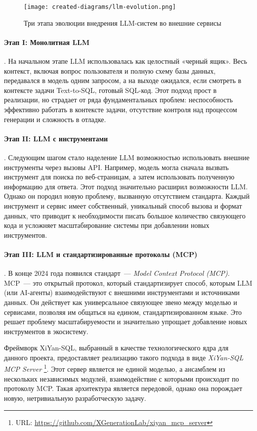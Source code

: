 \begin{figure}[h!]
	\centering
	\texttt{[image: created-diagrams/llm-evolution.png]}
	\caption{Три этапа эволюции внедрения LLM-систем во внешние сервисы}
	\label{fig:llm-evolution}
\end{figure}

\paragraph{Этап I: Монолитная LLM}. На начальном этапе LLM использовалась как целостный «черный ящик».
Весь контекст, включая вопрос пользователя и полную схему базы данных,
передавался в модель одним запросом, а на выходе ожидался, если смотреть в контексте задачи Text-to-SQL,
готовый SQL-код.
Этот подход прост в реализации, но страдает от ряда фундаментальных проблем: неспособность
эффективно работать в контексте задачи, отсутствие контроля над процессом генерации и
сложность в отладке.

\paragraph{Этап II: LLM с инструментами}. Следующим шагом стало наделение LLM возможностью
использовать внешние инструменты через вызовы API. Например, модель могла сначала
вызвать инструмент для поиска по веб-страницам, а затем использовать полученную информацию
для ответа. Этот подход значительно расширил возможности LLM. Однако он породил новую
проблему, вызванную отсутствием стандарта. Каждый инструмент и сервис имеет собственный,
уникальный способ вызова и формат данных, что приводит к необходимости писать большое
количество связующего кода и усложняет масштабирование системы при добавлении
новых инструментов.

\paragraph{Этап III: LLM и стандартизированные протоколы (MCP)}. В конце
2024 года появился стандарт~--- \textit{Model Context Protocol (MCP)}.
MCP~--- это открытый протокол,
который стандартизирует способ, которым LLM (или AI-агенты) взаимодействуют с внешними инструментами и
источниками данных. Он действует как универсальное связующее звено между моделью и
сервисами, позволяя им общаться на едином, стандартизированном языке. Это решает проблему
масштабируемости и значительно упрощает добавление новых инструментов в экосистему.

Фреймворк XiYan-SQL, выбранный в качестве технологического ядра для данного проекта,
предоставляет реализацию такого подхода в виде \textit{XiYan-SQL MCP
	Server} \footnote{URL: \url{https://github.com/XGenerationLab/xiyan_mcp_server}}.
Этот сервер является не единой моделью, а ансамблем из нескольких независимых модулей,
взаимодействие с которыми происходит по протоколу MCP. Такая архитектура является передовой,
однако она порождает новую, нетривиальную разработческую задачу.




